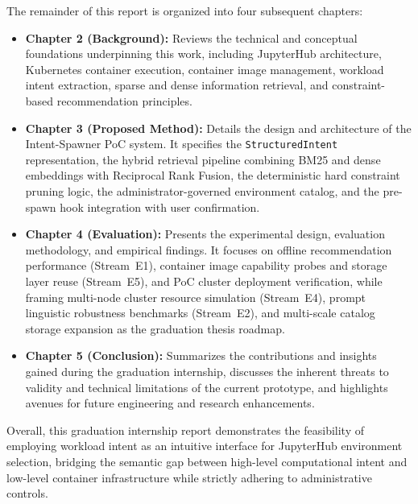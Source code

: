 The remainder of this report is organized into four subsequent chapters:
\begin{itemize}
    \item \textbf{Chapter 2 (Background):} Reviews the technical and conceptual foundations underpinning this work, including JupyterHub architecture, Kubernetes container execution, container image management, workload intent extraction, sparse and dense information retrieval, and constraint-based recommendation principles.
    
    \item \textbf{Chapter 3 (Proposed Method):} Details the design and architecture of the Intent-Spawner PoC system. It specifies the \texttt{StructuredIntent} representation, the hybrid retrieval pipeline combining BM25 and dense embeddings with Reciprocal Rank Fusion, the deterministic hard constraint pruning logic, the administrator-governed environment catalog, and the pre-spawn hook integration with user confirmation.
    
    \item \textbf{Chapter 4 (Evaluation):} Presents the experimental design, evaluation methodology, and empirical findings. It focuses on offline recommendation performance (Stream~E1), container image capability probes and storage layer reuse (Stream~E5), and PoC cluster deployment verification, while framing multi-node cluster resource simulation (Stream~E4), prompt linguistic robustness benchmarks (Stream~E2), and multi-scale catalog storage expansion as the graduation thesis roadmap.
    
    \item \textbf{Chapter 5 (Conclusion):} Summarizes the contributions and insights gained during the graduation internship, discusses the inherent threats to validity and technical limitations of the current prototype, and highlights avenues for future engineering and research enhancements.
\end{itemize}

Overall, this graduation internship report demonstrates the feasibility of employing workload intent as an intuitive interface for JupyterHub environment selection, bridging the semantic gap between high-level computational intent and low-level container infrastructure while strictly adhering to administrative controls.

